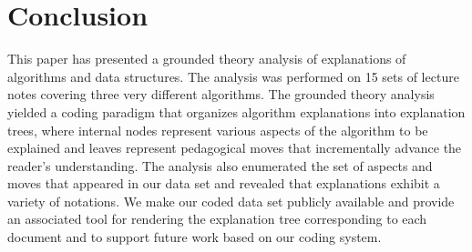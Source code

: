 \documentclass[sigconf]{acmart}
\begin{document}
% 


\section{Conclusion}
\label{sec:conc}

This paper has presented a grounded theory analysis of explanations of
algorithms and data structures. The analysis was performed on 15 sets of
lecture notes covering three very different algorithms.
%
The grounded theory analysis yielded a coding paradigm that organizes algorithm
explanations into explanation trees, where internal nodes represent various
aspects of the algorithm to be explained and leaves represent pedagogical moves
that incrementally advance the reader's understanding. The analysis also
enumerated the set of aspects and moves that appeared in our data set and
revealed that explanations exhibit a variety of notations.
%
We make our coded data set publicly available and provide an associated tool
for rendering the explanation tree corresponding to each document and to
support future work based on our coding system.
\end{document}
